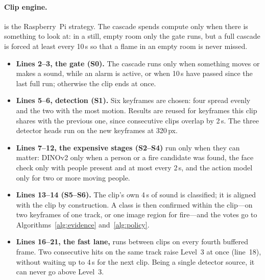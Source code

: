 \paragraph{Clip engine.}  is the Raspberry~Pi strategy. The cascade spends compute only when there is something to look at: in a still, empty room only the gate runs, but a full cascade is forced at least every 10\,s so that a flame in an empty room is never missed.
\begin{itemize}
\item \textbf{Lines 2--3, the gate (S0).} The cascade runs only when something moves or makes a sound, while an alarm is active, or when 10\,s have passed since the last full run; otherwise the clip ends at once.
\item \textbf{Lines 5--6, detection (S1).} Six keyframes are chosen: four spread evenly and the two with the most motion. Results are reused for keyframes this clip shares with the previous one, since consecutive clips overlap by 2\,s. The three detector heads run on the new keyframes at 320\,px.
\item \textbf{Lines 7--12, the expensive stages (S2--S4)} run only when they can matter: DINOv2 only when a person or a fire candidate was found, the face check only with people present and at most every 2\,s, and the action model only for two or more moving people.
\item \textbf{Lines 13--14 (S5--S6).} The clip's own 4\,s of sound is classified; it is aligned with the clip by construction. A class is then confirmed within the clip---on two keyframes of one track, or one image region for fire---and the votes go to Algorithms~\ref{alg:evidence} and~\ref{alg:policy}.
\item \textbf{Lines 16--21, the fast lane,} runs between clips on every fourth buffered frame. Two consecutive hits on the same track raise Level~3 at once (line~18), without waiting up to 4\,s for the next clip. Being a single detector source, it can never go above Level~3.
\end{itemize}

